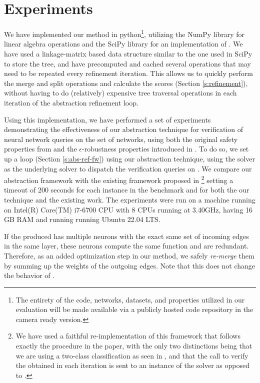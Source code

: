 \section{Experiments} 

We have implemented our method in python\footnote{The entirety of the code,
networks, datasets, and properties utilized in our evaluation will be made
available via a publicly hosted code repository in the camera ready version.}, 
utilizing the NumPy library for linear algebra
operations and the SciPy library for an implementation of \hcluster.
We have used a linkage-matrix based data structure similar to the one used in
SciPy to store the tree, and have precomputed and cached several
operations that may need to be repeated every refinement iteration. This allows
us to quickly perform the merge and split operations and calculate the
scores (Section \ref{s:refinement}), without having to do (relatively)
expensive tree traversal operations in each iteration of the abstraction
refinement loop. 

Using this implementation, we have performed a set of experiments demonstrating
the effectiveness of our abstraction technique for verification of neural
network queries on the \acasxu set of networks, using both the original safety
properties from \cite{reluplex} and the $\epsilon$-robustness properties
introduced in \cite{cegar-nn}. To do so, we set up a \cegar loop (Section
\ref{s:abs-ref-fw}) using our abstraction technique, using the \neuralsat solver
as the underlying solver to dispatch the verification queries on \abs.
We compare our abstraction framework with the existing \cegar framework proposed
in \cite{cegar-nn} \footnote{We have used a faithful re-implementation of this
framework that follows exactly the procedure in the paper, with the only two
distinctions being that we are using a two-class classification as seen in
\cite{chauhan2022efficiently,liu2022abstraction,10.1145/3644387},
and that the call to verify the \abs obtained in each iteration is sent to an
instance of the \neuralsat solver as opposed to \marabou. } 
setting a 
timeout of 200 seconds for each instance in the benchmark and for both the
our technique and the existing work.
The experiments were run on a machine running on Intel(R) Core(TM) 
i7-6700 CPU with 8 CPUs running at 3.40GHz, having 16 GB RAM and running running 
Ubuntu 22.04 LTS.

If the \abs produced has multiple neurons with the exact same set of incoming
edges in the same layer, these neurons compute the same function and are
redundant. Therefore, as an added optimization step in our method, 
we safely \textit{re-merge}
them by summing up the weights of the outgoing edges. 
Note that this does not change the behavior of \abs.

